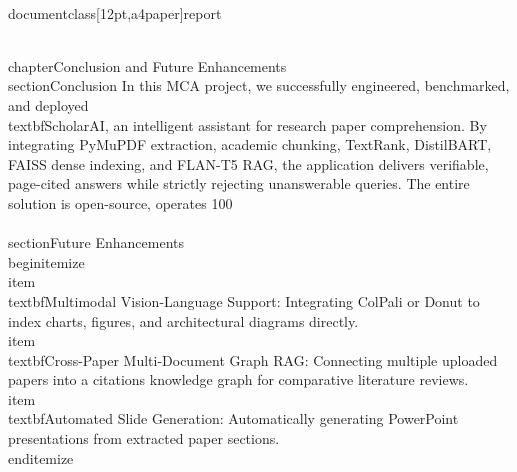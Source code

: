 \\documentclass[12pt,a4paper]{report}
\begin{document}
{%
\\chapter{Conclusion and Future Enhancements}
\\section{Conclusion}
In this MCA project, we successfully engineered, benchmarked, and deployed \\textbf{ScholarAI}, an intelligent assistant for research paper comprehension. By integrating PyMuPDF extraction, academic chunking, TextRank, DistilBART, FAISS dense indexing, and FLAN-T5 RAG, the application delivers verifiable, page-cited answers while strictly rejecting unanswerable queries. The entire solution is open-source, operates 100\\%

\\section{Future Enhancements}
\\begin{itemize}
    \\item \\textbf{Multimodal Vision-Language Support:} Integrating ColPali or Donut to index charts, figures, and architectural diagrams directly.
    \\item \\textbf{Cross-Paper Multi-Document Graph RAG:} Connecting multiple uploaded papers into a citations knowledge graph for comparative literature reviews.
    \\item \\textbf{Automated Slide Generation:} Automatically generating PowerPoint presentations from extracted paper sections.
\\end{itemize}

}
\end{document}
